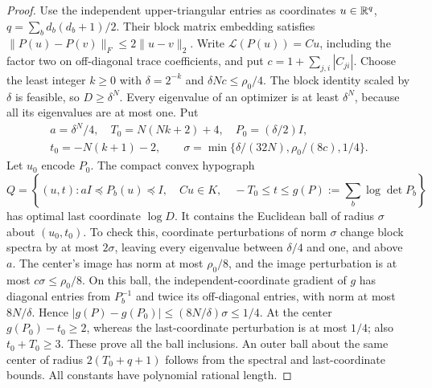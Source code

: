 \begin{proof}
Use the independent upper-triangular entries as coordinates
$u\in\mathbb R^q$, $q=\sum_bd_b(d_b+1)/2$. Their block matrix embedding
satisfies $\|P(u)-P(v)\|_F\le2\|u-v\|_2$. Write
$\mathcal L(P(u))=Cu$, including the factor two on off-diagonal trace
coefficients, and put $c=1+\sum_{j,i}|C_{ji}|$. Choose the
least integer $k\ge0$ with $\delta=2^{-k}$ and $\delta Nc\le\rho_0/4$. The block identity
scaled by $\delta$ is feasible, so $D\ge\delta^N$. Every eigenvalue
of an optimizer is at least $\delta^N$, because all its eigenvalues
are at most one. Put
\[
 \begin{gathered}
 a=\delta^N/4,\quad T_0=N(Nk+2)+4,\quad P_0=(\delta/2)I,\\
 t_0=-N(k+1)-2,\qquad
 \sigma=\min\{\delta/(32N),\rho_0/(8c),1/4\}.
 \end{gathered}
\]
Let $u_0$ encode $P_0$. The compact convex hypograph
\begin{equation}\label{eq:logdet-hypograph}
 Q=\left\{(u,t):aI\preceq P_b(u)\preceq I,\quad Cu\in K,\quad
                -T_0\le t\le g(P):=\sum_b\log\det P_b\right\}
\end{equation}
has optimal last coordinate $\log D$. It contains the Euclidean ball
of radius $\sigma$ about $(u_0,t_0)$. To check this, coordinate
perturbations of norm $\sigma$ change block spectra by at most
$2\sigma$, leaving every eigenvalue between $\delta/4$ and one, and
above $a$. The center's image has norm at most $\rho_0/8$, and the
image perturbation is at most $c\sigma\le\rho_0/8$. On this ball,
the independent-coordinate gradient of $g$ has diagonal entries from
$P_b^{-1}$ and twice its off-diagonal entries, with norm at most
$8N/\delta$. Hence
$|g(P)-g(P_0)|\le(8N/\delta)\sigma\le1/4$. At the center
$g(P_0)-t_0\ge2$, whereas the last-coordinate perturbation is at most
$1/4$; also $t_0+T_0\ge3$. These prove all the ball inclusions.
An outer ball about the same center of radius $2(T_0+q+1)$ follows
from the spectral and last-coordinate bounds. All constants have
polynomial rational length.


\end{proof}

